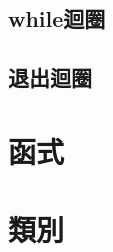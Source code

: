 \documentclass{article}
\begin{document}
\begin{large}
    \subsection{while迴圈}


    \subsection{退出迴圈}


\section{函式}


    \subsection{}


\section{類別}


    \subsection{}


\end{large}
\end{document}
